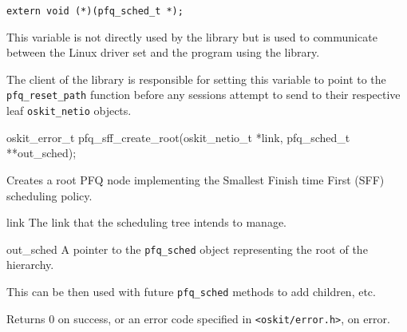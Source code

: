 \begin{apisyn}

	\texttt{extern void (*)(pfq_sched_t *);}
\end{apisyn}
\begin{apidesc}
	This variable is not directly used by the \hpfq{} library but
	is used to communicate between the Linux driver set and the
	program using the \hpfq{} library.

	The client of the \hpfq{} library is responsible for setting
	this variable to point to the \texttt{pfq_reset_path} function
	before any sessions attempt to send to their
	respective leaf \texttt{oskit_netio} objects.
\end{apidesc}



\begin{apisyn}

	\funcproto oskit_error_t pfq_sff_create_root(oskit_netio_t *link,
				pfq_sched_t **out_sched);
\end{apisyn}
\begin{apidesc}
	Creates a root PFQ node implementing the Smallest Finish time
	First (SFF) scheduling policy.
\end{apidesc}
\begin{apiparm}
	\item[link]
		The link that the scheduling tree intends to manage.
	\item[out_sched]
		A pointer to the \texttt{pfq_sched} object representing
		the root of the hierarchy.

		This can be then used with future \texttt{pfq_sched}
		methods to add children, etc.
\end{apiparm}
\begin{apiret}
	Returns 0 on success, or an error code specified in
	\texttt{<oskit/error.h>}, on error.
\end{apiret}

